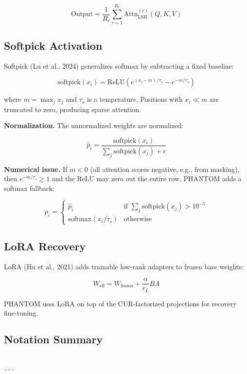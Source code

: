 \[
\text{Output} = \frac{1}{R_\ell} \sum_{r=1}^{R_\ell} \text{Attn}_{\text{LSH}}^{(r)}(Q, K, V)
\tag{3.8}
\]

\subsection{Softpick Activation}

Softpick (Lu et al., 2024) generalizes softmax by subtracting a fixed baseline:

\[
\text{softpick}(x_i) = \text{ReLU}\!\left(e^{(x_i - m)/\tau_s} - e^{-m/\tau_s}\right)
\tag{3.9}
\]

where $m = \max_j x_j$ and $\tau_s$ is a temperature. Positions with 
$x_i \ll m$ are truncated to zero, producing sparse attention.

\textbf{Normalization.} The unnormalized weights are normalized:

\[
\hat{p}_i = \frac{\text{softpick}(x_i)}{\sum_j \text{softpick}(x_j) + \epsilon}
\tag{3.10}
\]

\textbf{Numerical issue.} If $m < 0$ (all attention scores negative, e.g., from 
masking), then $e^{-m/\tau_s} \geq 1$ and the ReLU may zero out the entire 
row. PHANTOM adds a softmax fallback:

\[
p_i = \begin{cases} \hat{p}_i & \text{if } \sum_j \text{softpick}(x_j) > 10^{-5} \\ \text{softmax}(x_i / \tau_s) & \text{otherwise} \end{cases}
\tag{3.11}
\]

\subsection{LoRA Recovery}

LoRA (Hu et al., 2021) adds trainable low-rank adapters to frozen base weights:

\[
W_\text{eff} = W_\text{frozen} + \frac{\alpha}{r_L} B A
\tag{3.12}
\]

PHANTOM uses LoRA on top of the CUR-factorized projections for recovery 
fine-tuning.

\subsection{Notation Summary}

\begin{lstlisting}

---
\end{lstlisting}


